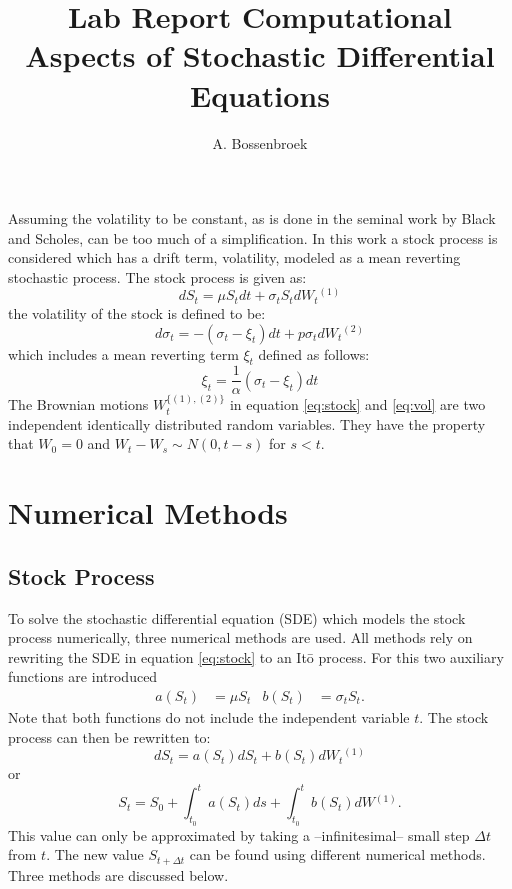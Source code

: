 \documentclass[a4paper,onecolumn]{IEEEtran}
\author{A. Bossenbroek}
\title{Lab Report Computational Aspects of Stochastic Differential Equations}
\begin{document}
\maketitle
Assuming the volatility to be constant, as is done in the seminal work by Black
and Scholes, can be too much of a simplification. In this work a stock process
is considered which has a drift term, volatility, modeled as a mean reverting
stochastic process. The stock process is given as:
\newcommand{\indst}{\ensuremath{^{(1)}}}
\newcommand{\indvl}{\ensuremath{^{(2)}}}
\begin{equation}\label{eq:stock}
dS_t = \mu S_t dt + \sigma_t S_t dW_t\indst
\end{equation}
the volatility of the stock is defined to be:
\begin{equation}\label{eq:vol}
d\sigma_t = -(\sigma_t - \xi_t)dt + p\sigma_t dW_t\indvl
\end{equation}
which includes a mean reverting term $\xi_t$ defined as follows:
\begin{equation}\label{eq:mnrvrt}
\xi_t = \frac{1}{\alpha}(\sigma_t - \xi_t)dt
\end{equation}
The Brownian motions $W_t^{\{(1), (2)\}}$ in  equation \eqref{eq:stock} and
\eqref{eq:vol} are two independent identically distributed random variables.
They have the property that $W_0=0$ and $W_t - W_s \sim N(0, t - s)$ for $s <
t$.

\section{Numerical Methods}
\subsection{Stock Process}
To solve the stochastic differential equation (SDE) which models the stock 
process numerically, three numerical methods are used. All methods rely on
rewriting the SDE in equation \eqref{eq:stock} to an It\=o process. For this two
auxiliary functions are introduced 
\begin{align}\label{eq:abstck}
a(S_t)&=\mu S_t&b(S_t)&=\sigma_t S_t.
\end{align}
Note that both functions do not include the independent variable $t$.  The
stock process can then be rewritten to:
\newcommand{\inttim}{\ensuremath{\int_{t_0}^{t}}}
\newcommand{\intdel}{\ensuremath{\int_{t}^{t + \Delta t}}}
\begin{equation*}
dS_t = a(S_t)dS_t + b(S_t)dW_t\indst
\end{equation*}
or
\begin{equation*}
S_t = S_0 + \inttim a(S_t)ds + \inttim b(S_t)dW\indst.
\end{equation*}
This value can only be approximated by taking a --infinitesimal-- small step
$\Delta t$ from $t$. The new value $S_{t + \Delta t}$ can be found using
different numerical methods. Three methods are discussed below.
\end{document}
